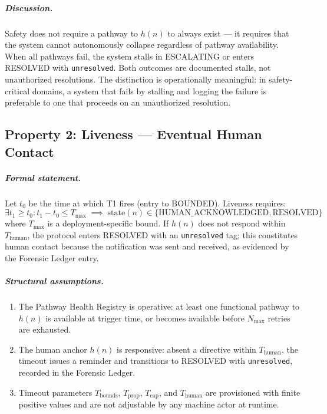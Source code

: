 \subparagraph{Discussion.} Safety does not require a pathway to $h(n)$ to always exist — it requires that the system cannot autonomously collapse regardless of pathway availability. When all pathways fail, the system stalls in ESCALATING or enters RESOLVED with \texttt{unresolved}. Both outcomes are documented stalls, not unauthorized resolutions. The distinction is operationally meaningful: in safety-critical domains, a system that fails by stalling and logging the failure is preferable to one that proceeds on an unauthorized resolution.

\subsection{Property 2: Liveness — Eventual Human Contact}


\subparagraph{Formal statement.} Let $t_0$ be the time at which T1 fires (entry to BOUNDED). Liveness requires:
\begin{equation}
\exists t_1 \geq t_0 : t_1 - t_0 \leq T_{\max}
\;\implies\;
\text{state}(n) \in \{\text{HUMAN\_ACKNOWLEDGED}, \text{RESOLVED}\}
\end{equation}
where $T_{\max}$ is a deployment-specific bound. If $h(n)$ does not respond within $T_{\text{human}}$, the protocol enters RESOLVED with an \texttt{unresolved} tag; this constitutes human contact because the notification was sent and received, as evidenced by the Forensic Ledger entry.

\subparagraph{Structural assumptions.}
\begin{enumerate}
\item[\textbf{A2.1}] The Pathway Health Registry is operative: at least one functional pathway to $h(n)$ is available at trigger time, or becomes available before $N_{\max}$ retries are exhausted.
\item[\textbf{A2.2}] The human anchor $h(n)$ is responsive: absent a directive within $T_{\text{human}}$, the timeout issues a reminder and transitions to RESOLVED with \texttt{unresolved}, recorded in the Forensic Ledger.
\item[\textbf{A2.3}] Timeout parameters $T_{\text{bounds}}$, $T_{\text{prop}}$, $T_{\text{cap}}$, and $T_{\text{human}}$ are provisioned with finite positive values and are not adjustable by any machine actor at runtime.
\end{enumerate}

